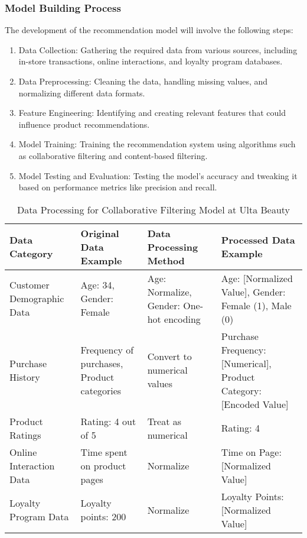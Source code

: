 \documentclass{article}
\begin{document}
\subsubsection{Model Building Process}
\label{sec:model_building_process}
The development of the recommendation model will involve the following steps:
\begin{enumerate}
    \item Data Collection: Gathering the required data from various sources, including in-store transactions, online interactions, and loyalty program databases.
    \item Data Preprocessing: Cleaning the data, handling missing values, and normalizing different data formats.
    \item Feature Engineering: Identifying and creating relevant features that could influence product recommendations.
    \item Model Training: Training the recommendation system using algorithms such as collaborative filtering and content-based filtering.
    \item Model Testing and Evaluation: Testing the model's accuracy and tweaking it based on performance metrics like precision and recall.
\end{enumerate}
\begin{table}[H]
\centering
\begin{tabular}{|l|p{3cm}|p{3cm}|p{3cm}|}
\hline
\textbf{Data Category} & \textbf{Original Data Example} & \textbf{Data Processing Method} & \textbf{Processed Data Example} \\
\hline
Customer Demographic Data & Age: 34, Gender: Female & Age: Normalize, Gender: One-hot encoding & Age: [Normalized Value], Gender: Female (1), Male (0) \\
\hline
Purchase History & Frequency of purchases, Product categories & Convert to numerical values & Purchase Frequency: [Numerical], Product Category: [Encoded Value] \\
\hline
Product Ratings & Rating: 4 out of 5 & Treat as numerical & Rating: 4 \\
\hline
Online Interaction Data & Time spent on product pages & Normalize & Time on Page: [Normalized Value] \\
\hline
Loyalty Program Data & Loyalty points: 200 & Normalize & Loyalty Points: [Normalized Value] \\
\hline
\end{tabular}
\caption{Data Processing for Collaborative Filtering Model at Ulta Beauty}
\label{table:data_processing_cf}
\end{table}
\end{document}
